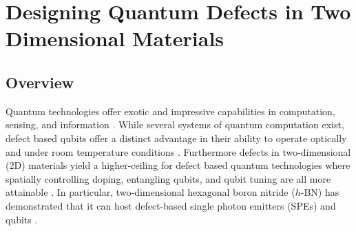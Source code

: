 \chapter{Designing Quantum Defects in Two Dimensional Materials}

\section{Overview}
Quantum technologies offer exotic and impressive capabilities in computation, sensing, and information \cite{malik2019science}. While several systems of quantum computation exist, defect based qubits offer a distinct advantage in their ability to operate optically and under room temperature conditions \cite{koehl2011room,weber2010quantum,falk2013polytype}. Furthermore defects in two-dimensional (2D) materials yield a higher-ceiling for defect based quantum technologies where spatially controlling doping, entangling qubits, and qubit tuning are all more attainable \cite{aharonovich2017quantum,sajid2020single}. In particular, two-dimensional hexagonal boron nitride ($h$-BN) has demonstrated that it can host defect-based single photon emitters (SPEs) \cite{grosso2017tunable} and qubits \cite{gottscholl2020initialization}.

